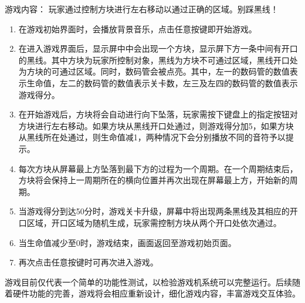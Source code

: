 游戏内容：
玩家通过控制方块进行左右移动以通过正确的区域。别踩黑线！
\begin{enumerate}
    \item 在游戏初始界面时，会播放背景音乐，点击任意按键即开始游戏。
    \item 在进入游戏界面后，显示屏中中会出现一个方块，显示屏下方一条中间有开口的黑线。其中方块为玩家所控制对象，黑线为方块不可通过区域，黑线开口处为方块的可通过区域。同时，数码管会被点亮。其中，左一的数码管的数值表示生命值，左二的数码管的数值表示关卡数，左三及左四的数码管的数值表示游戏得分。
    \item 在开始游戏后，方块将会自动进行向下坠落，玩家需按下键盘上的指定按钮对方块进行左右移动。如果方块从黑线开口处通过，则游戏得分加5，如果方块从黑线所在处通过，则生命值减1，两种情况下会分别播放不同的音符予以提示。
    \item 每次方块从屏幕最上方坠落到最下方的过程为一个周期。在一个周期结束后，方块将会保持上一周期所在的横向位置并再次出现在屏幕最上方，开始新的周期。
    \item 当游戏得分到达50分时，游戏关卡升级，屏幕中将出现两条黑线及其相应的开口区域，开口区域为随机生成，玩家需控制方块从两个开口处依次通过。
    \item 当生命值减少至0时，游戏结束，画面返回至游戏初始页面。
    \item 再次点击任意按键时可再次进入游戏。
\end{enumerate}

游戏目前仅代表一个简单的功能性测试，以检验游戏机系统可以完整运行。后续随着硬件功能的完善，游戏将会相应重新设计，细化游戏内容，丰富游戏交互体验。

